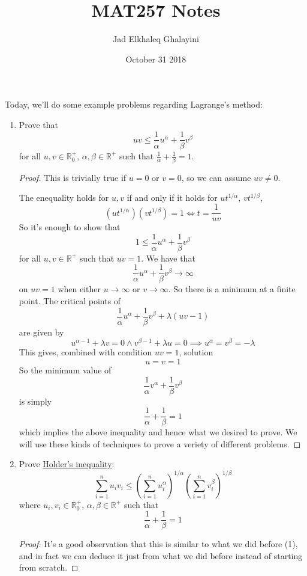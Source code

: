 \documentclass{article}
\title{MAT257 Notes}
\author{Jad Elkhaleq Ghalayini}
\date{October 31 2018}
\newcommand{\reals}[0]{\mathbb{R}}
\begin{document}
\maketitle

Today, we'll do some example problems regarding Lagrange's method:

\begin{enumerate}

  \item Prove that
  \[uv \leq \frac{1}{\alpha}u^\alpha + \frac{1}{\beta}v^\beta\]
  for all \(u, v \in \reals^+_0\), \(\alpha, \beta \in \reals^+\) such that \(\frac{1}{\alpha} + \frac{1}{\beta} = 1\).
  \begin{proof}
    This is trivially true if \(u = 0\) or \(v = 0\), so we can assume \(uv \neq 0\).

    The enequality holds for \(u, v\) if and only if it holds for \(ut^{1/\alpha}\), \(vt^{1/\beta}\),
    \[(ut^{1/\alpha})(vt^{1/\beta}) = 1 \iff t = \frac{1}{uv}\]
    So it's enough to show that
    \[1 \leq \frac{1}{\alpha}u^{\alpha} + \frac{1}{\beta}v^{\beta}\]
    for all \(u, v \in \reals^+\) such that \(uv = 1\).
    We have that
    \[\frac{1}{\alpha}u^\alpha + \frac{1}{\beta}v^\beta \to \infty\]
    on \(uv = 1\) when either \(u \to \infty\) or \(v \to \infty\). So there is a minimum at a finite point.
    The critical points of
    \[\frac{1}{\alpha}u^\alpha + \frac{1}{\beta}v^\beta + \lambda(uv - 1)\]
    are given by
    \[u^{\alpha - 1} + \lambda v = 0 \land v^{\beta - 1} + \lambda u = 0 \implies u^\alpha = v^\beta = -\lambda\]
    This gives, combined with condition \(uv = 1\), solution
    \[u = v = 1\]
    So the minimum value of
    \[\frac{1}{\alpha}v^\alpha + \frac{1}{\beta}v^\beta\]
    is simply
    \[\frac{1}{\alpha} + \frac{1}{\beta} = 1\]
    which implies the above inequality and hence what we desired to prove. We will use these kinds of techniques to prove a veriety of different problems.
  \end{proof}

  \item Prove \underline{Holder's inequality}:
  \[\sum_{i = 1}^nu_iv_i \leq \left(\sum_{i = 1}^nu_i^\alpha\right)^{1/\alpha}\left(\sum_{i = 1}^nv_i^\beta\right)^{1/\beta}\]
  where \(u_i, v_i \in \reals^+_0\), \(\alpha, \beta \in \reals^+\) such that
  \[\frac{1}{\alpha} + \frac{1}{\beta} = 1\]

  \begin{proof}
    It's a good observation that this is similar to what we did before (1), and in fact we can deduce it just from what we did before instead of starting from scratch.


\end{proof}
\end{enumerate}
\end{document}
